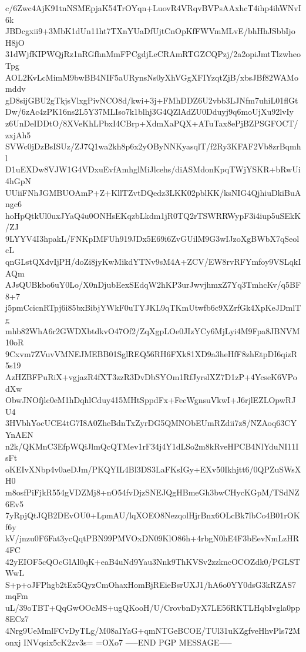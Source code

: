 c/6Zwc4AjK91tnNSMEpjaK54TrOYqn+LuovR4VRqvBVPsAAxhcT4ihp4ihWNvI6k
JBDcgxii9+3MbK1dUn11ht7TXnYUaDfUjtCnOpKfFWVmMLvE/bhHhJSbbIjoH8jO
31dWjfKIPWQjRz1nRGfhnMmFPCgdjLeCRAmRTGZCQPzj/2a2opiJmtTlzwheoTpg
AOL2KvLcMimM9bwBB4NIF5aURynsNs0yXhVGgXFIYzqtZjB/xbsJBf82WAMomddv
gD8sijGBU2gTkjsVlxgPivNCO8d/kwi+3j+FMhDDZ6U2vbb3LJNfm7uhiL01flGt
Dw/6zAc4zPK16ns2L5Y37MLIso7k1blhj3G4QZlAdZU0Dduyj9q6moUjXu92lvIy
z6UnDeIDDtO/8XVeKhLPbxI4CBrp+XdmXaPQX+ATuTax8ePjBZPSGFOCT/zxjAh5
SVWc0jDzBsISUz/ZJ7Q1wa2kh8p6x2yOByNNKyasqlT/f2Ry3KFAF2Vb8zrBqmhl
D1uEXDw8VJW1G4VDxuEvfAmhglMiJlcehs/diASMdonKpqTWjYSKR+bRwUi4hGpN
UUiiFNhJGMBUOAmP+Z+KllTZvtDQedz3LKK02pblKK/ksNIG4QjhiuDkiBuAngc6
hoHpQtkUl0uxJYaQ4u0ONHsEKqzbLkdm1jR0TQ2rTSWRRWypF3i4iup5uSEkK/ZJ
9LYYV4I3hpakL/FNKpIMFUh919JDx5E69i6ZvGUilM9G3wIJzoXgBWbX7qSeolcL
qnGLstQXdvIjPH/doZi8jyKwMikdYTNv9sM4A+ZCV/EW8rvRFYmfoy9VSLqkIAQm
AJsQUBkbo6uY0Lo/X0nDjubEexSEdqW2hKP3urJwvjhmxZ7Yq3TmhcKv/q5BF8+7
j5pmCcicnRTpj6i85bxBibjYWkF0uTYJKL9qTKmUtwfb6c9XZrfGk4XpKeJDmlTg
mhb82WhA6r2GWDXbtdkvO47Of2/ZqXgpLOe0JIzYCy6MjLyi4M9Fpa8JBNVM10oR
9Cxvm7ZVuvVMNEJMEBB01SglREQ56RH6FXk81XD9a3heHfF8zhEtpDI6qizR5s19
AzHZBFPuRiX+vgjazR4fXT3zzR3DvDbSYOm1RfJyrslXZ7D1zP+4YcseK6VPodXw
ObwJNOfjlc0eM1hDqhlCduy415MHtSppdFx+FecWgnsuVkwI+J6rjlEZLOpwRJU4
3HVbhYocUCE4tG7I8A0ZheBdnTxZyrDG5QMNObEUmRZdii7z8/NZAoq63CYYnAEN
n2k/QKMnC3EfpWQiJlmQcQTMev1rF34j4Y1dLSo2m8kRveHPCB4NlYduNI11IsFt
oKEIvXNbp4v0aeDJm/PKQYIL4Bl3DS3LaFKsIGy+EXv50Ikhjtt6/0QPZuSWsXH0
m8osfPiFjkR554gVDZMj8+nO54fvDjzSNEJQgHBmeGh3bwCHycKGpM/TSdNZ6Ev5
7yRpjQtJQB2DEvOU0+LpmAU/lqXOEO8NezqolHjrBnx6OLcBk7lbCo4B01rOKf6y
kV/jnzu0F6Fat3ycQqtPBN99PMVOxDN09KlO86h+4rbgN0hE4F3bEevNmLzHR4FC
42yEIOF5cQOcGlAl0qK+eaB4uNd9Yau3Nnk9ThKVSv2zzkncOCOZdk0/PGLSTWwL
S+p+oJFPhgb2tEx5QyzCmOhaxHomBjREieBsrUXJ1/hA6o0YY0dsG3kRZAS7mqFm
uL/39oTBT+QqGwOOcMS+ugQKooH/U/CrovbnDyX7LE56RKTLHqbIvgla0pp8ECz7
4Nrg9UeMmlFCvDyTLg/M08aIYaG+qmNTGeBCOE/TUl31uKZgfveHhvPls72Monxj
INVqsix5cK2zv3s=
=OXo7
-----END PGP MESSAGE-----
